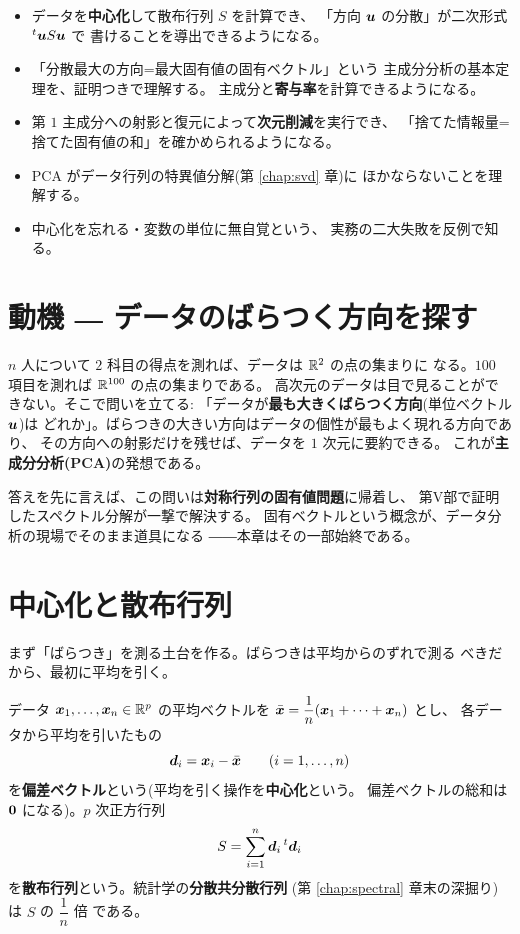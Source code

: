 \begin{goal}
\begin{itemize}
\item データを\textbf{中心化}して散布行列 $S$ を計算でき、
「方向 $\bm{u}$ の分散」が二次形式 ${}^t\bm{u}S\bm{u}$ で
書けることを導出できるようになる。
\item 「分散最大の方向=最大固有値の固有ベクトル」という
主成分分析の基本定理を、証明つきで理解する。
主成分と\textbf{寄与率}を計算できるようになる。
\item 第 $1$ 主成分への射影と復元によって\textbf{次元削減}を実行でき、
「捨てた情報量=捨てた固有値の和」を確かめられるようになる。
\item PCA がデータ行列の特異値分解(第 \ref{chap:svd} 章)に
ほかならないことを理解する。
\item 中心化を忘れる・変数の単位に無自覚という、
実務の二大失敗を反例で知る。
\end{itemize}
\end{goal}

\section{動機 ― データのばらつく方向を探す}

$n$ 人について $2$ 科目の得点を測れば、データは $\mathbb{R}^2$ の点の集まりに
なる。$100$ 項目を測れば $\mathbb{R}^{100}$ の点の集まりである。
高次元のデータは目で見ることができない。そこで問いを立てる:
「データが\textbf{最も大きくばらつく方向}(単位ベクトル $\bm{u}$)は
どれか」。ばらつきの大きい方向はデータの個性が最もよく現れる方向であり、
その方向への射影だけを残せば、データを $1$ 次元に要約できる。
これが\textbf{主成分分析(PCA)}の発想である。

答えを先に言えば、この問いは\textbf{対称行列の固有値問題}に帰着し、
第V部で証明したスペクトル分解が一撃で解決する。
固有ベクトルという概念が、データ分析の現場でそのまま道具になる
――本章はその一部始終である。

\section{中心化と散布行列}

まず「ばらつき」を測る土台を作る。ばらつきは平均からのずれで測る
べきだから、最初に平均を引く。

\begin{teigi}[中心化と散布行列]\label{def:pca-scatter}
データ $\bm{x}_1, \dots, \bm{x}_n \in \mathbb{R}^p$ の平均ベクトルを
$\bar{\bm{x}} = \dfrac{1}{n}(\bm{x}_1 + \cdots + \bm{x}_n)$ とし、
各データから平均を引いたもの
\[
\bm{d}_i = \bm{x}_i - \bar{\bm{x}} \qquad (i = 1, \dots, n)
\]
を\textbf{偏差ベクトル}という(平均を引く操作を\textbf{中心化}という。
偏差ベクトルの総和は $\bm{0}$ になる)。$p$ 次正方行列
\[
S = \sum_{i=1}^{n} \bm{d}_i\,{}^t\bm{d}_i
\]
を\textbf{散布行列}という。統計学の\textbf{分散共分散行列}
(第 \ref{chap:spectral} 章末の深掘り)は $S$ の $\dfrac{1}{n}$ 倍
である。
\end{teigi}

